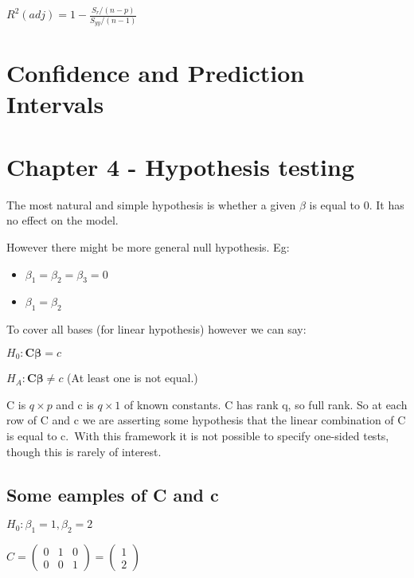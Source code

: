\documentclass[
  letterpaper,
  DIV=11,
  numbers=noendperiod]{scrreprt}
\providecommand{\tightlist}{%
  \setlength{\itemsep}{0pt}\setlength{\parskip}{0pt}}\usepackage{longtable,booktabs,array}
\begin{document}
\(R^2(adj) = 1 - \frac{S_r/(n-p)}{S_{yy}/(n-1)}\)

\hypertarget{confidence-and-prediction-intervals}{%
\section{Confidence and Prediction
Intervals}\label{confidence-and-prediction-intervals}}

\hypertarget{chapter-4---hypothesis-testing}{%
\section{Chapter 4 - Hypothesis
testing}\label{chapter-4---hypothesis-testing}}

The most natural and simple hypothesis is whether a given \(\beta\) is
equal to 0. It has no effect on the model.

However there might be more general null hypothesis. Eg:

\begin{itemize}
\tightlist
\item
  \(\beta_1 = \beta_2 = \beta_3 = 0\)
\item
  \(\beta_1 = \beta_2\)
\end{itemize}

To cover all bases (for linear hypothesis) however we can say:

\(H_0 : \boldsymbol{C\beta} = c\)

\(H_A : \boldsymbol{C\beta} \neq c\) (At least one is not equal.)

C is \(q \times p\) and c is \(q \times 1\) of known constants. C has
rank q, so full rank. So at each row of C and c we are asserting some
hypothesis that the linear combination of C is equal to c.~With this
framework it is not possible to specify one-sided tests, though this is
rarely of interest.

\hypertarget{some-eamples-of-c-and-c}{%
\subsection{Some eamples of C and c}\label{some-eamples-of-c-and-c}}

\(H_0 : \beta_1 = 1, \beta_2=2\)

\(C = \begin{pmatrix} 0 & 1 & 0\\ 0 & 0 & 1 \end{pmatrix} = \begin{pmatrix} 1 \\ 2 \end{pmatrix}\)
\end{document}

